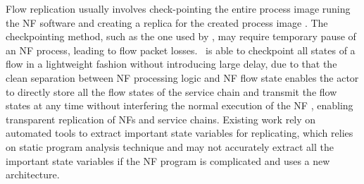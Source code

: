 Flow replication usually involves check-pointing the entire process image \ac{ runing the NF software} %
and creating a replica for the created process image \cite{sherry2015rollback} \cite{rajagopalan2013pico}. The checkpointing method, such as the one used by \cite{sherry2015rollback}, may require temporary pause of an NF process, leading to flow packet losses. %
\nfactor~is able to checkpoint all states of a flow in a lightweight fashion without introducing large delay, due to that the clean separation between NF processing logic and NF flow state enables the actor to directly store all the flow states of the service chain and transmit the flow states at any time without interfering the normal execution of the NF%
, enabling transparent replication of NFs and service chains.  Existing work \cite{sherry2015rollback} rely on automated tools to extract important state variables for replicating, which \ac{relies on static program analysis technique and may not accurately extract all the important state variables if the NF program is complicated and uses a new architecture}.%







